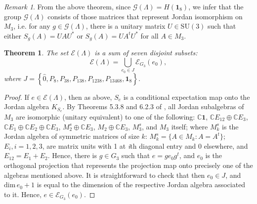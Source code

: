 \documentclass[12pt]{article}
\theoremstyle{plain}
\newtheorem{theorem}{Theorem}
\theoremstyle{definition}
\theoremstyle{remark}
\newtheorem{remark}{Remark}
\numberwithin{equation}{section}
\begin{document}
\begin{remark}
From the above theorem,
since $\mathcal{G}(\Lambda) = H(\mathbf{1}_{8})$,
 we infer that
the group $\mathcal{G}(\Lambda)$ consists of those matrices that represent
Jordan isomorphism on $M_{3}$,
i.e. for any $g \in \mathcal{G}(\Lambda)$,
there is a unitary matrix $U \in \text{SU}(3)$ such that
either $S_{g}(A) = U A U^{*}$ or $S_{g}(A) = U A^{t} U^{*}$
for all $A \in M_{3}$.
\end{remark}

\begin{theorem}
\label{thm:Idempotents}
The set $\mathcal{E}(\Lambda)$
    is a sum of seven disjoint subsets:
    \begin{equation}
        \mathcal{E}(\Lambda) = \bigcup \limits_{e_{0} \in J} \mathcal{E}_{G_{3}}(e_{0}),
    \end{equation}
    where $J = \left \{ \hat{0}, P_{8}, P_{38}, P_{138}, P_{1238}, P_{13468}, \mathbf{1}_{8} \right \}$.
\end{theorem}
\begin{proof}
    If $e \in \mathcal{E}(\Lambda)$, then as above, $S_{e}$ is a conditional
    expectation map onto the Jordan algebra $K_{S_{e}}$.
    By Theorems 5.3.8 and 6.2.3 of \cite{hanche1984jordan},
    all Jordan subalgebras of $M_{3}$ are isomorphic (unitary equivalent)
    to one of the following:
    $\mathbb{C}\mathbf{1}$, 
    $\mathbb{C} E_{12} \oplus \mathbb{C} E_{3}$,
    $\mathbb{C} E_{1} \oplus \mathbb{C} E_{2} \oplus \mathbb{C} E_{3}$,
    $M_{2}^{s} \oplus \mathbb{C} E_{3}$, 
    $M_{2} \oplus \mathbb{C} E_{3}$,
    $M_{3}^{s}$,
    and
    $M_{3}$ itself;
    where $M_{k}^{s}$ is the Jordan algebra of symmetric matrices of 
    size $k$: $M_{k}^{s} = \{ A \in M_{k}: A = A^{t} \}$;
    $E_{i}, i = 1,2,3$, are matrix units with 1 at \emph{i}th diagonal entry
    and 0 elsewhere, and $E_{12} = E_{1} + E_{2}$.
    Hence, there is $g \in G_{3}$ such that
    $e = g e_{0} g ^{t}$, and $e_{0}$ is the orthogonal projection
    that represents the projection map onto precisely one of the algebras
    mentioned above.
    It is straightforward to check that then $e_{0} \in J$,
    and $\text{dim} \, e_{0} + 1$ is equal to the dimension of the respective
    Jordan algebra associated to it.
    Hence, $e \in \mathcal{E}_{G_{3}}(e_{0})$.
\end{proof}
\end{document}
